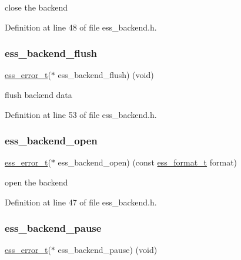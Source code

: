 close the backend 

Definition at line 48 of file ess\+\_\+backend.\+h.

\mbox{\label{structess__backend_a9c44052ce6dbe82ca0e25b45b78f0849}} 
\subsubsection{\texorpdfstring{ess\+\_\+backend\+\_\+flush}{ess\_backend\_flush}}
{\footnotesize\ttfamily \hyperlink{ess__error_8h_a08ab97fcf6745dee67de912e41bd3236}{ess\+\_\+error\+\_\+t}($\ast$  ess\+\_\+backend\+\_\+flush) (void)}

flush backend data 

Definition at line 53 of file ess\+\_\+backend.\+h.

\mbox{\label{structess__backend_a52aa7fbd63ffa3f65a00412b27a25191}} 
\subsubsection{\texorpdfstring{ess\+\_\+backend\+\_\+open}{ess\_backend\_open}}
{\footnotesize\ttfamily \hyperlink{ess__error_8h_a08ab97fcf6745dee67de912e41bd3236}{ess\+\_\+error\+\_\+t}($\ast$  ess\+\_\+backend\+\_\+open) (const \hyperlink{ess__format_8h_a9aa23f58a25b9e8360c1400e0cadfd80}{ess\+\_\+format\+\_\+t} format)}

open the backend 

Definition at line 47 of file ess\+\_\+backend.\+h.

\mbox{\label{structess__backend_ad32efdc09b8cce643d02f7d4ace79aab}} 
\subsubsection{\texorpdfstring{ess\+\_\+backend\+\_\+pause}{ess\_backend\_pause}}
{\footnotesize\ttfamily \hyperlink{ess__error_8h_a08ab97fcf6745dee67de912e41bd3236}{ess\+\_\+error\+\_\+t}($\ast$  ess\+\_\+backend\+\_\+pause) (void)}

